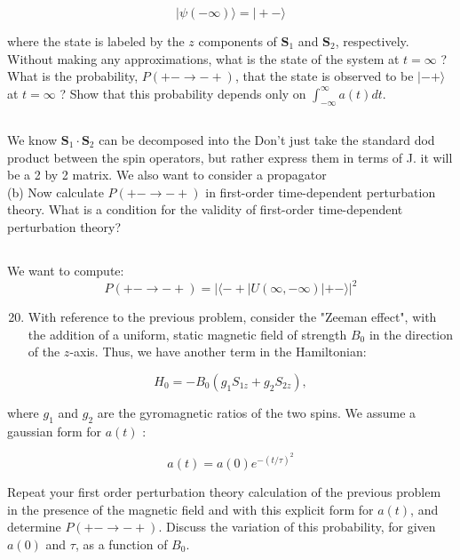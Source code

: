 \documentclass[12pt]{article}
\begin{document}
$$
|\psi(-\infty)\rangle=|+-\rangle
$$

where the state is labeled by the $z$ components of $\mathbf{S}_{1}$ and $\mathbf{S}_{2}$, respectively. Without making any approximations, what is the state of the system at $t=\infty$ ? What is the probability, $P(+-\rightarrow-+)$, that the state is observed to be $|-+\rangle$ at $t=\infty$ ? Show that this probability depends only on $\int_{-\infty}^{\infty} a(t) d t$.
\subsection{}
We know $\mathbf{S}_{1} \cdot \mathbf{S}_{2}$ can be decomposed into the 
Don't just take the standard dod product between the spin operators, but rather express them in terms of J. it will be a 2 by 2 matrix. We also want to consider a propagator\\
(b) Now calculate $P(+-\rightarrow-+)$ in first-order time-dependent perturbation theory. What is a condition for the validity of first-order time-dependent perturbation theory?
\subsection{}
We want to compute:
\begin{equation}
  P(+-\rightarrow-+)=|\langle-+|U(\infty,-\infty)|+-\rangle|^{2}
\end{equation}
\begin{enumerate}
  \setcounter{enumi}{19}
  \item With reference to the previous problem, consider the "Zeeman effect", with the addition of a uniform, static magnetic field of strength $B_{0}$ in the direction of the $z$-axis. Thus, we have another term in the Hamiltonian:
\end{enumerate}

$$
H_{0}=-B_{0}\left(g_{1} S_{1 z}+g_{2} S_{2 z}\right),
$$

where $g_{1}$ and $g_{2}$ are the gyromagnetic ratios of the two spins. We assume a gaussian form for $a(t)$ :

$$
a(t)=a(0) e^{-(t / \tau)^{2}}
$$

Repeat your first order perturbation theory calculation of the previous problem in the presence of the magnetic field and with this explicit form for $a(t)$, and determine $P(+-\rightarrow-+)$. Discuss the variation of this probability, for given $a(0)$ and $\tau$, as a function of $B_{0}$.
\end{document}
